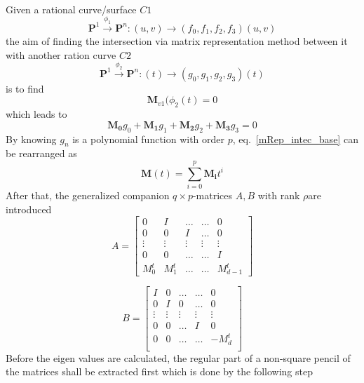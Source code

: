 \paragraph{} 
Given a rational curve/surface $C1$
    \begin{equation}
        \mathbf{P}^1 \xrightarrow{\phi_1} \mathbf{P}^n: (u,v) \rightarrow(f_0,f_1,f_2,f_3)(u,v)
    \end{equation}
the aim of finding the intersection via matrix representation method between it with another ration curve $C2$
    \begin{equation}
        \mathbf{P}^1 \xrightarrow{\phi_2} \mathbf{P}^n: (t) \rightarrow(g_0,g_1,g_2,g_3)(t)
    \end{equation}
is to find
    \begin{equation}
        \mathbf{M}_{v1}(\phi_2(t) = 0
    \end{equation}
which leads to
    \begin{equation}
        \mathbf{M_0}g_0 + \mathbf{M_1}g_1 + \mathbf{M_2}g_2 + \mathbf{M_3}g_3 = 0
        \label{mRep_intec_base}
    \end{equation}
By knowing $g_n$ is a polynomial function with order $p$, eq.~\eqref{mRep_intec_base} can be rearranged as
    \begin{equation}
        \mathbf{M}(t) = \sum_{i=0}^p \mathbf{M_i}t^i
    \end{equation}
After that, the generalized companion $q\times p$-matrices $A,B$ with rank $\rho$are introduced
    \begin{equation}
        A = 
        \begin{bmatrix}
            0		&I 		&\dots 		&\dots 		&0 		\\
            0 		&0 		&I 			&\dots 		&0 		\\
            \vdots 	&\vdots &\vdots 	&\vdots 	&\vdots \\
            0 		&0 		&\dots		&\dots 		&I 		\\
            M_0^t 	&M_1^t 	&\dots 		&\dots 		&M_{d-1}^t
        \end{bmatrix}
    \end{equation}

    \begin{equation}
        B = 
        \begin{bmatrix}
            I 		&0 		&\dots 		&\dots 		&0 		\\
            0 		&I 		&0 			&\dots 		&0 		\\
            \vdots 	&\vdots &\vdots 	&\vdots 	&\vdots \\
            0 		&0 		&\dots 		&I 			&0 		\\
            0 		&0 		&\dots 		&\dots 		&-M_d^t \\		
        \end{bmatrix}
    \end{equation}
Before the eigen values are calculated, the regular part of a non-square pencil of the matrices shall be extracted first which is done by the following step
